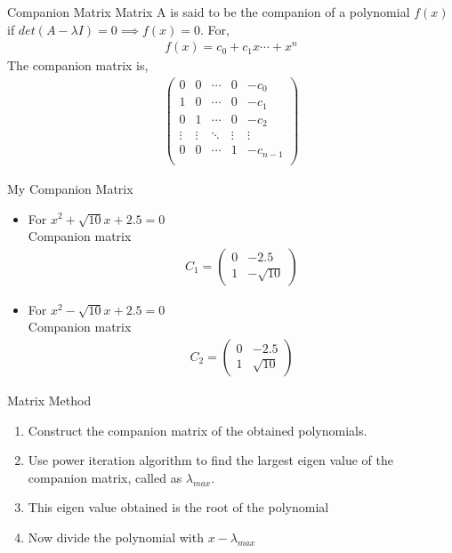 \documentclass{beamer}
\providecommand{\brak}[1]{\ensuremath{\left(#1\right)}}
\theoremstyle{remark}
\newcommand{\myvec}[1]{\ensuremath{\begin{pmatrix}#1\end{pmatrix}}}
\numberwithin{equation}{section}
\begin{document}
\begin{frame}{Companion Matrix}
    Matrix A is said to be the companion of a polynomial $f\brak{x}$ if 
    $det\brak{A - \lambda I} = 0 \implies f\brak{x} = 0$. 
    \newline
    For,
    \begin{align}
      f\brak{x} = c_0 + c_1 x \cdots + x^n
    \end{align}
    The companion matrix is,
    \begin{align}
      \myvec{
        0 & 0 & \cdots & 0 & -c_0\\
        1 & 0 & \cdots & 0 & -c_1\\
        0 & 1 & \cdots & 0 & -c_2\\
        \vdots & \vdots & \ddots & \vdots & \vdots\\
        0 & 0 & \cdots & 1 & -c_{n-1}\\
      }
\end{align}
\end{frame}

\begin{frame}{My Companion Matrix}
    \begin{itemize}
        \item For $x^2 + \sqrt{10}x + 2.5 = 0$\\
        Companion matrix
        \begin{align}
            C_1 = \myvec{0 & -2.5 \\ 1 & -\sqrt{10}}
        \end{align}
        \item For $x^2 - \sqrt{10}x + 2.5 = 0$\\
        Companion matrix
        \begin{align}
            C_2 = \myvec{0 & -2.5 \\ 1 & \sqrt{10}}
        \end{align}
    \end{itemize}
\end{frame}

\begin{frame}{Matrix Method}
    \begin{enumerate}
        \item Construct the companion matrix of the obtained polynomials.
        \item Use power iteration algorithm to find the largest eigen value of the companion matrix, called as $\lambda_{max}$.
        \item This eigen value obtained is the root of the polynomial
        \item Now divide the polynomial with $x - \lambda_{max}$
    \end{enumerate}
\end{frame}
\end{document}
